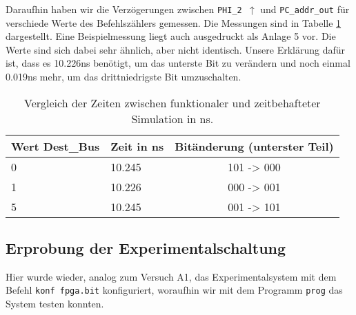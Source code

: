 \documentclass[12pt,a4paper]{scrartcl}
\begin{document}
Daraufhin haben wir die Verz\"ogerungen zwischen \texttt{PHI\_2 $\uparrow$} und \texttt{PC\_addr\_out} f\"ur verschiede Werte des Befehlsz\"ahlers gemessen.
Die Messungen sind in Tabelle \ref{vergleich} dargestellt.
Eine Beispielmessung liegt auch ausgedruckt als Anlage 5 vor.
Die Werte sind sich dabei sehr \"ahnlich, aber nicht identisch.
Unsere Erkl\"arung daf\"ur ist, dass es 10.226ns ben\"otigt, um das unterste Bit zu ver\"andern und noch einmal 0.019ns mehr, um das drittniedrigste Bit umzuschalten.

\begin{table}[h]
    \centering
    \begin{tabular}{l|l|c}
    \hline
    Wert Dest\_Bus & Zeit in ns & Bit\"anderung (unterster Teil)\\
    \hline
    0              & 10.245     & 101 -> 000 \\ %
    1              & 10.226     & 000 -> 001 \\ %
    5              & 10.245     & 001 -> 101 \\ %
    \hline
    \end{tabular}
    \caption{Vergleich der Zeiten zwischen funktionaler und zeitbehafteter Simulation in ns.}
    \label{vergleich}
\end{table}

\subsection{Erprobung der Experimentalschaltung}

Hier wurde wieder, analog zum Versuch A1, das Experimentalsystem mit dem Befehl \texttt{konf fpga.bit} konfiguriert, woraufhin wir mit dem Programm \texttt{prog} das System testen konnten.


\newcommand{\off}{\fullmoon}
\newcommand{\on}{\newmoon}
\end{document}
